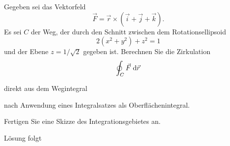 \documentclass{atistandalonetask}
\begin{document}
  \begin{atiTask}[
    title = Integralsatz
  ]

Gegeben sei das Vektorfeld 
\[\vec{F}=\vec{r}\times (\vec{i}+\vec{j}+\vec{k}).\] Es sei $C$ der Weg, der durch den Schnitt zwischen dem Rotationsellipsoid 
\[
2(x^2+y^2)+z^2=1
\] und der Ebene $z=1/\sqrt{2}$ gegeben ist.  Berechnen Sie die Zirkulation 
\[\oint _C\vec{F}\;\mathrm{d}\vec{r}
\]
	\begin{atiSubtasks}
		\item direkt aus dem Wegintegral
		\item nach Anwendung eines Integralsatzes als Oberflächenintegral.
	\end{atiSubtasks} 
	Fertigen Sie eine Skizze des Integrationsgebietes an.
  \end{atiTask}
  \begin{atiSolution}
  Lösung folgt
  \end{atiSolution}
\end{document}
